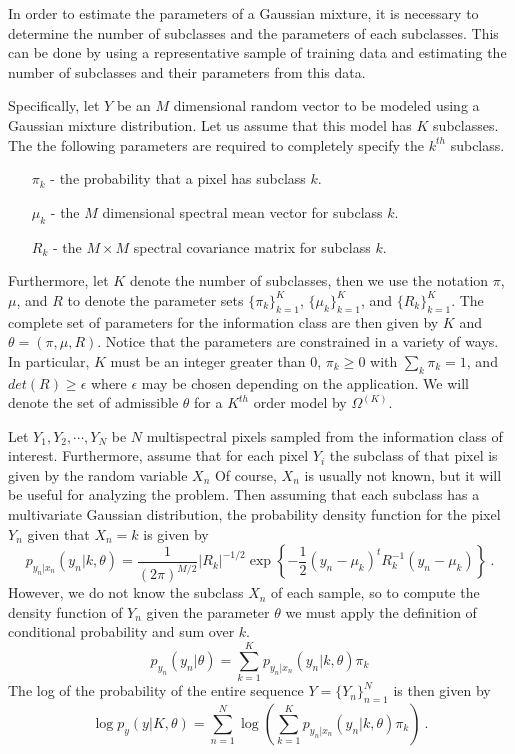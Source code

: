 \documentclass[12pt]{article}
\begin{document}
In order to estimate the parameters of a Gaussian mixture,
it is necessary to determine the
number of subclasses and the parameters of each subclasses.
This can be done by using a representative sample
of training data and estimating the number
of subclasses and their parameters from this data.

Specifically, let $Y$ be an $M$ dimensional random vector 
to be modeled using a Gaussian mixture distribution.
Let us assume that this model has $K$ subclasses.
The the following parameters are required to completely specify 
the $k^{th}$ subclass.
\begin{itemize}
\item[$\pi_k$] - the probability that a pixel has subclass $k$.
\item[$\mu_k$] - the $M$ dimensional spectral mean vector for subclass $k$.
\item[$R_k$] - the $M\times M$ spectral covariance matrix for subclass $k$.
\end{itemize}
Furthermore, let $K$ denote the number of subclasses,
then we use the notation $\pi$, $\mu$, and $R$ to
denote the parameter sets $\{\pi_k\}_{k=1}^K$, $\{\mu_k\}_{k=1}^K$, 
and $\{R_k\}_{k=1}^K$.
The complete set of parameters
for the information class
are then given by $K$ and $\theta = (\pi,\mu,R)$.
Notice that the parameters are constrained in a variety
of ways. 
In particular, $K$ must be an integer greater than 0,
$\pi_k\geq 0$ with $\sum_k \pi_k = 1$, 
and $det(R)\geq \epsilon$ where $\epsilon$ may be chosen depending
on the application.
We will denote the set of admissible $\theta$ for a $K^{th}$ order model 
by $\Omega^{(K)}$.

Let $Y_1,Y_2,\cdots,Y_N$ be $N$ multispectral pixels
sampled from the information class of interest.
Furthermore, assume that for each pixel $Y_i$
the subclass of that pixel is given by the random variable $X_n$
Of course, $X_n$ is usually not known, but it will be useful
for analyzing the problem.
Then assuming that each subclass has
a multivariate Gaussian distribution,
the probability density function for the pixel $Y_n$
given that $X_n=k$ is given by
$$
p_{y_n|x_n}(y_n|k,\theta) = \frac{1}{(2\pi)^{M/2}} \left| R_k \right|^{-1/2}
\exp \left\{ -\frac{1}{2} (y_n-\mu_k)^t  R_k^{-1} (y_n-\mu_k) \right\} \ .
$$
However, we do not know the subclass $X_n$ of each sample, so to compute
the density function of $Y_n$ given the parameter $\theta$ we must
apply the definition of conditional probability and sum over $k$.
$$
p_{y_n}( y_n |\theta ) = \sum_{k=1}^K p_{y_n|x_n}(y_n | k,\theta) \pi_k
$$
The log of the probability of the entire sequence $Y = \{Y_n\}_{n=1}^N$
is then given by
\begin{equation}
\log p_y( y |K,\theta ) = \sum_{n=1}^N \log \left( \sum_{k=1}^K
p_{y_n|x_n}(y_n | k,\theta) \pi_k \right) \ .
\label{eq:log_like}
\end{equation}
\end{document}
